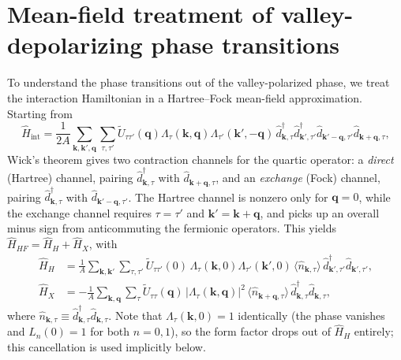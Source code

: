 \section{Mean-field treatment of valley-depolarizing phase transitions}\label{sec:meanfield}

To understand the phase transitions out of the valley-polarized phase, we treat the interaction Hamiltonian in a Hartree--Fock mean-field approximation. Starting from %
\begin{equation}
    \hat{H}_{\text{int}} = \frac{1}{2A} \sum_{\mathbf{k}, \mathbf{k'}, \mathbf{q}} \sum_{\tau, \tau'} \tilde{U}_{\tau \tau'}(\mathbf{q}) \Lambda_\tau(\mathbf{k}, \mathbf{q}) \Lambda_{\tau'}(\mathbf{k'}, -\mathbf{q}) \, \hat{d}^\dagger_{\mathbf{k},\tau} \hat{d}^\dagger_{\mathbf{k'},\tau'} \hat{d}_{\mathbf{k'-q},\tau'} \hat{d}_{\mathbf{k+q},\tau},
    \label{eq:hint_repeat}
\end{equation}
Wick's theorem gives two contraction channels for the quartic operator: a \emph{direct} (Hartree) channel, pairing $\hat{d}^\dagger_{\mathbf{k},\tau}$ with $\hat{d}_{\mathbf{k+q},\tau}$, and an \emph{exchange} (Fock) channel, pairing $\hat{d}^\dagger_{\mathbf{k},\tau}$ with $\hat{d}_{\mathbf{k'-q},\tau'}$. The Hartree channel is nonzero only for $\mathbf{q}=0$, while the exchange channel requires $\tau=\tau'$ and $\mathbf{k'}=\mathbf{k}+\mathbf{q}$, and picks up an overall minus sign from anticommuting the fermionic operators. This yields $\hat{H}_{HF} = \hat{H}_H + \hat{H}_X$, with
\begin{align}
    \hat{H}_H &= \frac{1}{A} \sum_{\mathbf{k}, \mathbf{k'}} \sum_{\tau, \tau'} \tilde{U}_{\tau \tau'}(0) \, \Lambda_\tau(\mathbf{k}, 0) \Lambda_{\tau'}(\mathbf{k'}, 0) \, \langle \hat{n}_{\mathbf{k},\tau} \rangle \, \hat{d}^\dagger_{\mathbf{k'},\tau'} \hat{d}_{\mathbf{k'},\tau'}, \label{eq:hartree_op}\\
    \hat{H}_X &= -\frac{1}{A} \sum_{\mathbf{k}, \mathbf{q}} \sum_{\tau} \tilde{U}_{\tau \tau}(\mathbf{q}) \, |\Lambda_\tau(\mathbf{k}, \mathbf{q})|^2 \, \langle \hat{n}_{\mathbf{k+q},\tau} \rangle \, \hat{d}^\dagger_{\mathbf{k},\tau} \hat{d}_{\mathbf{k},\tau}, \label{eq:fock_op}
\end{align}
where $\hat{n}_{\mathbf{k},\tau} \equiv \hat{d}^\dagger_{\mathbf{k},\tau}\hat{d}_{\mathbf{k},\tau}$. Note that $\Lambda_\tau(\mathbf{k},0) = 1$ identically (the phase vanishes and $L_n(0)=1$ for both $n=0,1$), so the form factor drops out of $\hat H_H$ entirely; this cancellation is used implicitly below.

